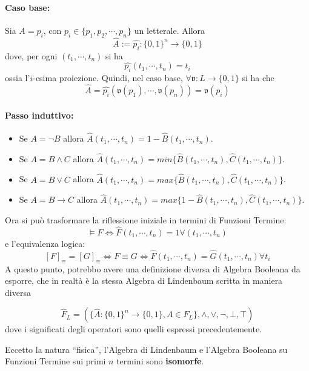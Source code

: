 \paragraph{Caso base:} 
Sia 
$ A = p_i$, con $p_i \in \{p_1, p_2, \cdots, p_n\}$ un letterale.
Allora 
$$
\hat{A} := \hat{p_i} : \{0,1\}^n \rightarrow \{0,1\}
$$ 
dove, per ogni $(t_1, \cdots, t_n)$ si ha 
$$
\hat{p_i}(t_1, \cdots, t_n) = t_i
$$
ossia l'$i$-esima proiezione. 
Quindi, nel caso base, $\forall \mathfrak{v}: L \rightarrow \{0,1\}$ si ha che 
$$
\hat{A} = \hat{p_i}(\mathfrak{v}(p_1), \cdots, \mathfrak{v}(p_n)) = \mathfrak{v}(p_i)
$$
\paragraph{Passo induttivo:}
\begin{itemize}
        \item Se $A = \neg B$ allora $\hat{A}(t_1, \cdots, t_n) =  1 - \hat{B}(t_1, \cdots, t_n)$. 

        \item Se $A = B \land C$ allora $\hat{A}(t_1, \cdots, t_n) = min \{\hat{B}(t_1, \cdots, t_n), \hat{C}(t_1, \cdots, t_n)\}$. 
        \item Se $A = B \lor C$ allora $\hat{A}(t_1, \cdots, t_n) = max \{\hat{B}(t_1, \cdots, t_n), \hat{C}(t_1, \cdots, t_n)\}$. 
        \item Se $A = B \rightarrow C$ allora $\hat{A}(t_1, \cdots, t_n) = max \{1 - \hat{B}(t_1, \cdots, t_n), \hat{C}(t_1, \cdots, t_n)\}$. 
\end{itemize}

Ora si può trasformare la riflessione iniziale in termini di Funzioni Termine: 
$$
\models F \iff \hat{F}(t_1, \cdots, t_n) = 1 \forall (t_1, \cdots, t_n)
$$
e l'equivalenza logica: 
$$
[F]_{\equiv} = [G]_{\equiv} \iff F \equiv G \iff \hat{F}(t_1, \cdots, t_n) = \hat{G}(t_1, \cdots, t_n) \forall t_i
$$
A questo punto, potrebbo avere una definizione diversa di Algebra Booleana da 
esporre, che in realtà è la stessa Algebra di Lindenbaum scritta in maniera 
diversa
\begin{defi}
$$
\hat{F}_L = (\{\hat{A}: \{0,1\}^n \rightarrow \{0,1\}, A \in F_L\}, \land, \lor, \neg, \bot, \top) 
$$
dove i significati degli operatori sono quelli espressi precedentemente. 
\end{defi}

Eccetto la natura ``fisica'', l'Algebra di Lindenbaum e l'Algebra Booleana su 
Funzioni Termine sui
primi $n$ termini sono \textbf{isomorfe}. 

